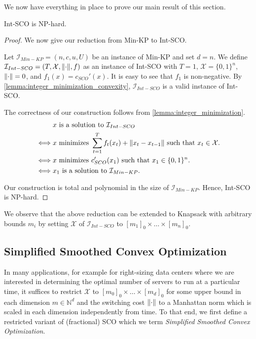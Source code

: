 We now have everything in place to prove our main result of this section.

\begin{theorem}
Int-SCO is NP-hard.
\end{theorem}
\begin{proof}
We now give our reduction from Min-KP to Int-SCO.

Let $\mathcal{I}_{Min-KP} = (n, c, u, U)$ be an instance of Min-KP and set $d = n$. We define $\mathcal{I}_{Int-SCO} = (T, \mathcal{X}, \lVert\cdot\rVert, f)$ as an instance of Int-SCO with $T = 1$, $\mathcal{X} = \{0,1\}^n$, $\lVert\cdot\rVert = 0$, and $f_1(x) = c_{SCO}'(x)$. It is easy to see that $f_1$ is non-negative. By \autoref{lemma:integer_minimization_convexity}, $\mathcal{I}_{Int-SCO}$ is a valid instance of Int-SCO.

The correctness of our construction follows from \autoref{lemma:integer_minimization}. \begin{align*}
         &x \text{ is a solution to } \mathcal{I}_{Int-SCO} \\
    \iff &x \text{ minimizes } \sum_{t=1}^T f_t(x_t) + \lVert x_t - x_{t-1}\rVert \text{ such that } x_t \in \mathcal{X}. \\
    \iff &x \text{ minimizes } c_{SCO}'(x_1) \text{ such that } x_1 \in \{0,1\}^n. \\
    \iff &x_1 \text{ is a solution to } \mathcal{I}_{Min-KP}.
\end{align*}

Our construction is total and polynomial in the size of $\mathcal{I}_{Min-KP}$. Hence, Int-SCO is NP-hard.
\end{proof}

We observe that the above reduction can be extended to Knapsack with arbitrary bounds $m_i$ by setting $\mathcal{X}$ of $\mathcal{I}_{Int-SCO}$ to $[m_1]_0 \times \dots \times [m_n]_0$.

\subsection{Simplified Smoothed Convex Optimization}
\label{section:theory:simplified_smoothed_convex_optimization}

In many applications, for example for right-sizing data centers where we are interested in determining the optimal number of servers to run at a particular time, it suffices to restrict $\mathcal{X}$ to $[m_0]_0 \times \dots \times [m_d]_0$ for some upper bound in each dimension $m \in \mathbb{N}^d$ and the switching cost $\lVert\cdot\rVert$ to a Manhattan norm which is scaled in each dimension independently from time. To that end, we first define a restricted variant of (fractional) SCO which we term \textit{Simplified Smoothed Convex Optimization}.

